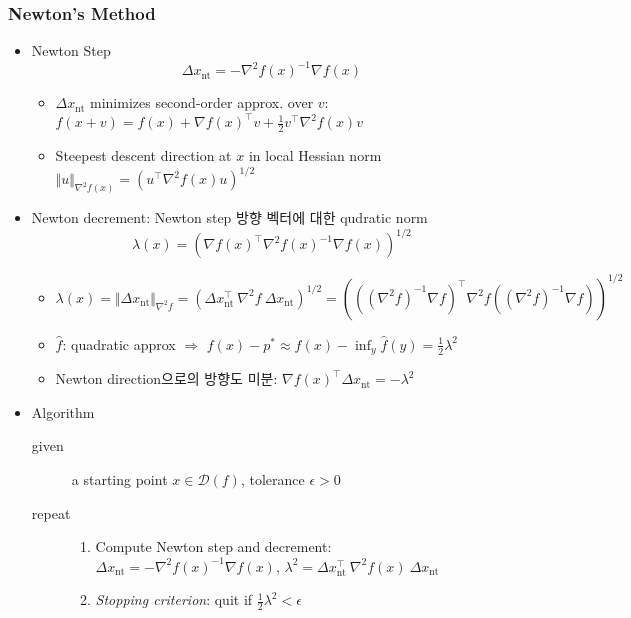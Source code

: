 \subsubsection*{Newton's Method}
\begin{itemize}
    \item Newton Step
    \begin{equation}
        \Delta x_\mathrm{nt}=-\nabla^2f(x)^{-1}\nabla f(x)
    \end{equation}
    \begin{itemize}
        \item $\Delta x_\mathrm{nt}$ minimizes second-order approx. over $v$: $f(x+v)=f(x)+\nabla f(x)^{\top}v+\frac{1}{2}v^{\top}\nabla^2f(x)v$
        \item Steepest descent direction at $x$ in local Hessian norm $\Vert u\Vert_{\nabla^2 f(x)}=\left(u^{\top}\nabla^2 f(x)u\right)^{1/2}$
    \end{itemize}
    \item Newton decrement: Newton step 방향 벡터에 대한 qudratic norm
    \begin{equation}
        \lambda(x) = \left(\nabla f(x)^{\top}\nabla^2f(x)^{-1}\nabla f(x)\right)^{1/2}
    \end{equation}
    \begin{itemize}
        \item $\lambda(x)=\Vert\Delta x_\mathrm{nt}\Vert_{\nabla^2f}=(\Delta x_\mathrm{nt}^{\top}~\nabla^2f~\Delta x_\mathrm{nt})^{1/2}=\left(((\nabla^2 f)^{-1}\nabla f)^{\top}\nabla^2 f((\nabla^2 f)^{-1}\nabla f)\right)^{1/2}$
        \item $\hat{f}$: quadratic approx $\Rightarrow$ $f(x)-p^\ast\approx f(x)-\inf_y\hat{f}(y)=\frac{1}{2}\lambda^2$
        \item Newton direction으로의 방향도 미분: $\nabla f(x)^{\top}\Delta x_\mathrm{nt}=-\lambda^2$
    \end{itemize}
    \item Algorithm
    \begin{description}
        \item[given] a starting point $x\in\mathcal{D}(f)$, tolerance $\epsilon>0$
        \item[repeat] \phantom{}
        \begin{enumerate}
            \item Compute Newton step and decrement: $\Delta x_\mathrm{nt}=-\nabla^2f(x)^{-1}\nabla f(x)$, $\lambda^2=\Delta x_\mathrm{nt}^{\top}~\nabla^2f(x)~\Delta x_\mathrm{nt}$
            \item \textit{Stopping criterion}: quit if $\frac{1}{2}\lambda^2<\epsilon$

\end{enumerate}
\end{description}
\end{itemize}
